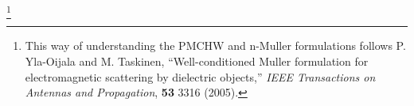 \documentclass[letterpaper]{article}
\begin{document}
\footnote{This way of understanding the PMCHW and n-Muller
formulations follows P. Yla-Oijala and M. Taskinen,
``Well-conditioned Muller formulation for electromagnetic 
scattering by dielectric objects,'' \textit{IEEE Transactions 
on Antennas and Propagation}, \textbf{53} 3316 (2005).}

\newpage
\end{document}
